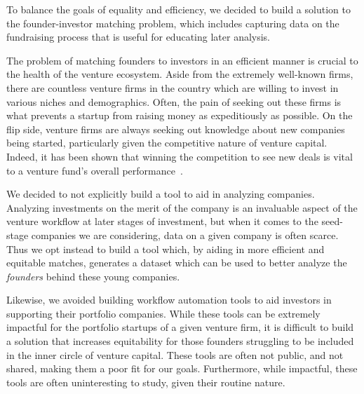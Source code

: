 To balance the goals of equality and efficiency, we decided to build a solution to the founder-investor matching problem, which includes capturing data on the fundraising process that is useful for educating later analysis.

The problem of matching founders to investors in an efficient manner is crucial to the health of the venture ecosystem. Aside from the extremely well-known firms, there are countless venture firms in the country which are willing to invest in various niches and demographics. Often, the pain of seeking out these firms is what prevents a startup from raising money as expeditiously as possible. On the flip side, venture firms are always seeking out knowledge about new companies being started, particularly given the competitive nature of venture capital. Indeed, it has been shown that winning the competition to see new deals is vital to a venture fund's overall performance~\cite{doi:10.1111/j.1540-6261.2007.01207.x}.

We decided to not explicitly build a tool to aid in analyzing companies. Analyzing investments on the merit of the company is an invaluable aspect of the venture workflow at later stages of investment, but when it comes to the seed-stage companies we are considering, data on a given company is often scarce. Thus we opt instead to build a tool which, by aiding in more efficient and equitable matches, generates a dataset which can be used to better analyze the \textit{founders} behind these young companies.

Likewise, we avoided building workflow automation tools to aid investors in supporting their portfolio companies. While these tools can be extremely impactful for the portfolio startups of a given venture firm, it is difficult to build a solution that increases equitability for those founders struggling to be included in the inner circle of venture capital. These tools are often not public, and not shared, making them a poor fit for our goals. Furthermore, while impactful, these tools are often uninteresting to study, given their routine nature.

